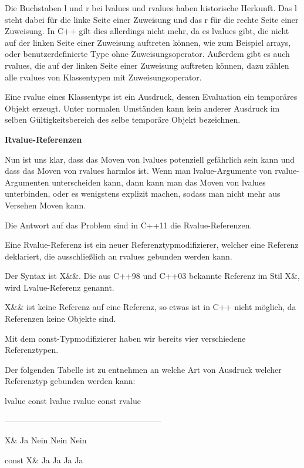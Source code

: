 \documentclass{article}
\begin{document}
\parindent=0pt
Die Buchstaben l und r bei lvalues und rvalues haben historische Herkunft. Das 
l steht dabei für die linke Seite einer Zuweisung und das r für die rechte Seite 
einer Zuweisung. In C++ gilt dies allerdings nicht mehr, da es lvalues gibt, die 
nicht auf der linken Seite einer Zuweisung auftreten können, wie zum Beispiel 
arrays, oder benutzerdefinierte Type ohne Zuweisungsoperator. Außerdem gibt es 
auch rvalues, die auf der linken Seite einer Zuweisung auftreten können, dazu 
zählen alle rvalues von Klassentypen mit Zuweisungsoperator.

Eine rvalue eines Klassentyps ist ein Ausdruck, dessen Evaluation ein temporäres 
Objekt erzeugt. Unter normalen Umständen kann kein anderer Ausdruck im selben 
Gültigkeitsbereich des selbe temporäre Objekt bezeichnen.

\vspace{38pt}
\textbf{Rvalue-Referenzen}

Nun ist uns klar, dass das Moven von lvalues potenziell gefährlich sein kann und 
dass das Moven von rvalues harmlos ist. Wenn man lvalue-Argumente von rvalue-Argumenten 
unterscheiden kann, dann kann man das Moven von lvalues unterbinden, oder es wenigstens 
explizit machen, sodass man nicht mehr aus Versehen Moven kann.

Die Antwort auf das Problem sind in C++11 die Rvalue-Referenzen.

Eine Rvalue-Referenz ist ein neuer Referenztypmodifizierer, welcher eine Referenz 
deklariert, die ausschließlich an rvalues gebunden werden kann.

Der Syntax ist X\&\&. Die aus C++98 und C++03 bekannte Referenz im Stil X\&, wird 
Lvalue-Referenz genannt.

X\&\& ist keine Referenz auf eine Referenz, so etwas ist in C++ nicht möglich, 
da Referenzen keine Objekte sind.

Mit dem const-Typmodifizierer haben wir bereits vier verschiedene Referenztypen.

Der folgenden Tabelle ist zu entnehmen an welche Art von Ausdruck welcher Referenztyp 
gebunden werden kann:            

\parindent=43pt
lvalue   const lvalue   rvalue   const rvalue

\parindent=0pt
---------------------------------------------------------              

X\&          Ja     Nein           Nein     Nein

const X\&    Ja        Ja             Ja       Ja
\end{document}
